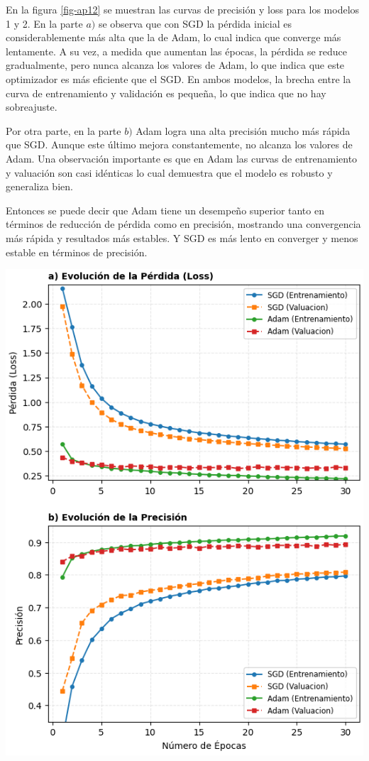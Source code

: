 \documentclass[aps,prl,reprint,groupedaddress]{revtex4-2}
\newenvironment{Figura}
  {\par\medskip\noindent\minipage{\linewidth}}
  {\endminipage\par\medskip}
\begin{document}
En la figura \ref{fig-ap12} se muestran las curvas de precisión y loss para los
modelos 1 y 2. En la parte $a)$ se observa que con SGD la pérdida inicial es 
considerablemente más alta que la de Adam, lo cual indica que converge más 
lentamente. A su vez, a medida que aumentan las épocas, la pérdida se reduce 
gradualmente, pero nunca alcanza los valores de Adam, lo que indica que este 
optimizador es más eficiente que el SGD. En ambos modelos, la brecha 
entre la curva de entrenamiento y validación es pequeña, lo que indica que no
hay sobreajuste.

Por otra parte, en la parte $b)$ Adam logra una alta precisión mucho más rápida
que SGD. Aunque este último mejora constantemente, no alcanza los valores de Adam. 
Una observación importante es que en Adam las curvas de entrenamiento y 
valuación son casi idénticas lo cual demuestra que el modelo es robusto y 
generaliza bien.

Entonces se puede decir que Adam tiene un desempeño superior tanto en términos 
de reducción de pérdida como en precisión, mostrando una convergencia más 
rápida y resultados más estables. Y SGD es más lento en converger y menos
estable en términos de precisión. 

\begin{Figura}
  \centering
  \includegraphics[width=1\textwidth]{figs/modelos_plots.png}
  \label{fig-ap12}
\end{Figura}
\end{document}
